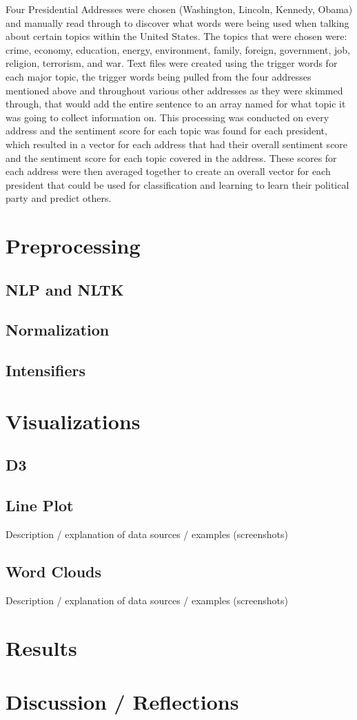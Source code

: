 \documentclass[reqno,12pt,oneside,letter]{report}
\begin{document}
	Four Presidential Addresses were chosen (Washington, Lincoln, Kennedy, Obama) and manually read through to discover what words were being used when talking about certain topics within the United States. The topics that were chosen were: crime, economy, education, energy, environment, family, foreign, government, job, religion, terrorism, and war. Text files were created using the trigger words for each major topic, the trigger words being pulled from the four addresses mentioned above and throughout various other addresses as they were skimmed through, that would add the entire sentence to an array named for what topic it was going to collect information on. This processing was conducted on every address and the sentiment score for each topic was found for each president, which resulted in a vector for each address that had their overall sentiment score and the sentiment score for each topic covered in the address. These scores for each address were then averaged together to create an overall vector for each president that could be used for classification and learning to learn their political party and predict others.

\chapter{Preprocessing}

\section{NLP and NLTK}

\section{Normalization}

\section{Intensifiers}

\chapter{Visualizations}

\section{D3}

\section{Line Plot}
Description / explanation of data sources / examples (screenshots)

\section{Word Clouds}
Description / explanation of data sources / examples (screenshots)

\chapter{Results}

\chapter{Discussion / Reflections}

{


}
\end{document}
